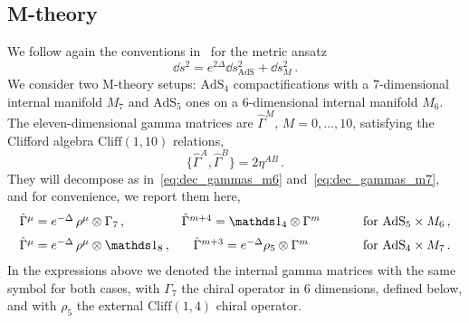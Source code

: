 \documentclass[debug]{phd}
\begin{document}
\subsection{M-theory}
\label{app:mtheoryconv}
%
We follow again the conventions in~\cite{Grana_Ntokos} for the metric ansatz
\begin{equation}
	\dd  s^2 = e^{2\Delta}\dd  s^2_{\mathrm{AdS}} + \dd  s^2_{M} \, .
\end{equation}
We consider two M-theory setups: $\mathrm{AdS}_4$ compactifications with a $7$-dimensional internal manifold $M_7$
and $\mathrm{AdS}_5$ ones on a $6$-dimensional internal manifold $M_6$.
The eleven-dimensional gamma matrices are $\hat{\Gamma}^M$, $M=0,\ldots, 10$, satisfying the Clifford algebra $\mathrm{Cliff}(1,10)$ relations, 
\begin{equation}
	\{\hat{\Gamma}^A , \hat{\Gamma}^B \} = 2 \eta^{AB}\, .
\end{equation}
They will decompose as in~\eqref{eq:dec_gammas_m6} and~\eqref{eq:dec_gammas_m7}, and for convenience, we report them here,
\begin{equation}
\label{11gammadec}
	\begin{array}{lccr}
		\hat{\Gamma}^\mu = e^{-\Delta}\,\rho^\mu \otimes \Gamma_7\, , & \hat{\Gamma}^{m+4} = \id_4 \otimes \Gamma^m\, & \phantom{\mbox{for}} &\mbox{for}~\mathrm{AdS}_5 \times M_6\, , \\[2mm]
		\hat{\Gamma}^\mu = e^{-\Delta}\,\rho^\mu \otimes \id_8\, , & \hat{\Gamma}^{m+3} =e^{-\Delta} \rho_5 \otimes \Gamma^m\, &\phantom{\mbox{for}} &\mbox{for}~\mathrm{AdS}_4 \times M_7\, .
	\end{array}
\end{equation} 
In the expressions above we denoted the internal gamma matrices with the same symbol for both cases, with $\Gamma_7$ the chiral operator in $6$ dimensions, defined below, and with $\rho_5$ the external $\mathrm{Cliff}(1,4)$ chiral operator.
\end{document}
